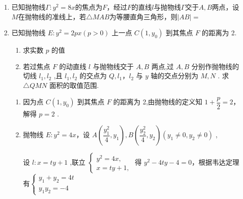 \begin{enumerate}
\begin{enumerate}
        \item 已知抛物线$\Gamma: y^2 = 8x$的焦点为$F$，经过$F$的直线$l$与抛物线$\Gamma$交于$A, B$两点，设$M$在抛物线的准线上，若$\triangle MAB$为等腰直角三角形，则$|AB| = $
        \begin{jieda}
        \end{jieda}
        \item 已知抛物线 $E : {y}^{2} = {2px}\left( {p > 0}\right)$ 上一点 $C\left( {1,{y}_{0}}\right)$ 到其焦点 $F$ 的距离为 2.
        \begin{enumerate}
            \item 求实数 $p$ 的值
            \item 若过焦点 $F$ 的动直线 $l$ 与抛物线交于 $A,B$ 两点,过 $A,B$ 分别作抛物线的切线 ${l}_{1},{l}_{2}$ ,且 ${l}_{1},{l}_{2}$ 的交点为 $Q,{l}_{1}$，${l}_{2}$ 与 $y$ 轴的交点分别为 $M,N$ . 求 $\bigtriangleup {QMN}$ 面积的取值范围.
        \end{enumerate}
        \begin{jieda}
            \begin{enumerate}
                \item 因为点 $C\left( {1,{y}_{0}}\right)$ 到其焦点 $F$ 的距离为 2,由抛物线的定义知 $1 + \dfrac{p}{2} = 2$，解得 $p = 2$ .
                \item 抛物线 $E : {y}^{2} = {4x}$，设 $A\left( {\dfrac{{y}_{1}^{2}}{4},{y}_{1}}\right) ,B\left( {\dfrac{{y}_{2}^{2}}{4},{y}_{2}}\right) \left( {{y}_{1} \neq  0,{y}_{2} \neq  0}\right)$ ,
                
                设 $l : x = {ty} + 1$ ,联立 $\left\{  \begin{array}{l} {y}^{2} = {4x}, \\  x = {ty} + 1, \end{array}\right.$ 得 ${y}^{2} - {4ty} - 4 = 0$，根据韦达定理有$\left\{\begin{array}{l}
                     {y}_{1} + {y}_{2} = {4t}  \\
                     {y}_{1}{y}_{2} =  - 4
                \end{array}\right.$
                

\end{enumerate}
\end{jieda}
\end{enumerate}
\end{enumerate}
